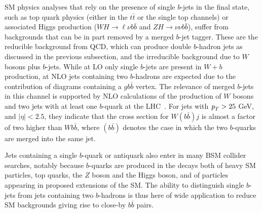 SM physics analyses that rely on the presence of single $b$-jets in the final state, such as top quark physics (either in the $t\bar{t}$ or the single top channels) or associated Higgs production ($WH\rightarrow\ell\nu b\bar{b}$ and $ZH\rightarrow\nu\nu b\bar{b}$),  suffer from backgrounds that can be in part removed by a merged $b$-jet tagger. These are the reducible background from QCD, which can produce double $b$-hadron jets as discussed in the previous subsection, and the irreducible background due to $W$ bosons plus $b$-jets. 
While at LO only single $b$-jets are present in $W+b$ production, at NLO jets containing two $b$-hadrons are expected due to the contribution of diagrams containing a $gb\bar{b}$ vertex.
The relevance of merged $b$-jets in this channel is supported by NLO calculations of the production of $W$ bosons and two jets with at least one $b$-quark at the LHC~\cite{Campbell:2006}. For jets with ${\emph{p}_{T}} > 25$ GeV, and $|\eta| < 2.5$, they indicate that the cross section for $W(b\bar{b})j$ is almost a factor of two higher than $Wb\bar{b}$, where $(b\bar{b})$ denotes the case in which the two $b$-quarks are merged into the same jet. 

Jets containing a single $b$-quark or antiquark
also enter in many BSM collider searches, notably because $b$-quarks are produced in the decays both of heavy SM particles, \eg top quarks, the $Z$ boson and the Higgs boson, and of particles appearing in proposed extensions of the SM. The ability to distinguish single $b$-jets from jets containing two $b$-hadrons is thus here of wide application to reduce SM backgrounds giving rise to close-by $b\bar{b}$ pairs.

